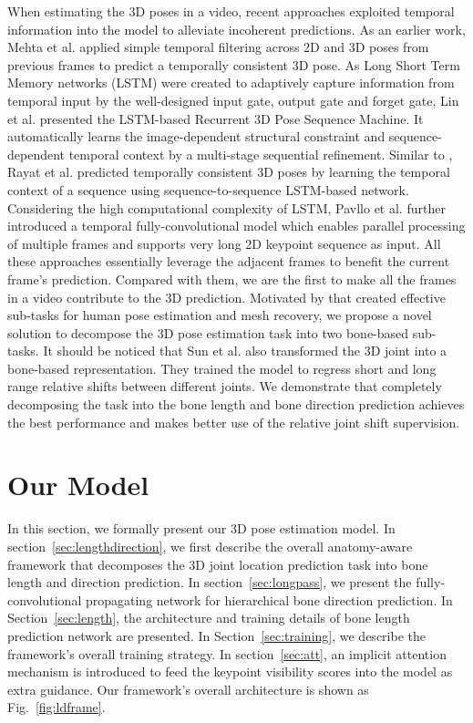 \documentclass[journal]{IEEEtran}
\begin{document}
When estimating the 3D poses in a video, recent approaches exploited temporal information into the model to alleviate incoherent predictions. As an earlier work, Mehta et al. \cite{mehta2017vnect} applied simple temporal filtering across 2D and 3D poses from previous frames to predict a temporally consistent 3D pose. As Long Short Term Memory networks (LSTM) were created to adaptively capture information from temporal input by the well-designed input gate, output gate and forget gate, Lin et al. \cite{lin2017recurrent} presented the LSTM-based Recurrent 3D Pose Sequence Machine. It automatically learns the image-dependent structural constraint and sequence-dependent temporal context by a multi-stage sequential refinement. Similar to \cite{lin2017recurrent}, Rayat et al. \cite{rayat2018exploiting} predicted temporally consistent 3D poses by learning the temporal context of a sequence using sequence-to-sequence LSTM-based network. Considering the high computational complexity of LSTM,  Pavllo et al. \cite{pavllo20193d} further introduced a temporal fully-convolutional model which enables parallel processing of multiple frames and supports very long 2D keypoint sequence as input. All these approaches essentially leverage the adjacent frames to benefit the current frame's prediction. Compared with them, we are the first to make all the frames in a video contribute to the 3D prediction. Motivated by \cite{yu2017multitask,zhou2016deep,kanazawa2018end} that created effective sub-tasks for human pose estimation and mesh recovery, we propose a novel solution to decompose the 3D pose estimation task into two bone-based sub-tasks. It should be noticed that Sun et al. \cite{sun2017compositional} also transformed the 3D joint into a bone-based representation. They trained the model to regress short and long range relative shifts between different joints. We demonstrate that completely decomposing the task into the bone length and bone direction prediction achieves the best performance and makes better use of the relative joint shift supervision.   \section{Our Model} \label{sec:model}
\vspace{-1mm}
In this section, we formally present our 3D pose estimation model. In section~\ref{sec:lengthdirection}, we first describe the overall anatomy-aware framework that decomposes the 3D joint location prediction task into bone length and direction prediction. In section~\ref{sec:longpass}, we present the fully-convolutional propagating network for hierarchical bone direction prediction. In Section~\ref{sec:length}, the architecture and training details of bone length prediction network are presented. In Section~\ref{sec:training}, we describe the framework's overall training strategy. In section~\ref{sec:att}, an implicit attention mechanism is introduced to feed the keypoint visibility scores into the model as extra guidance. Our framework's overall architecture is shown as Fig.~\ref{fig:ldframe}.
\end{document}
